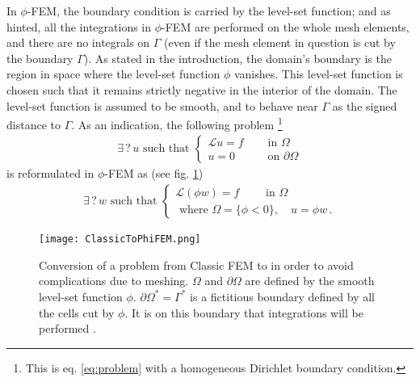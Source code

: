 In $\phi$-FEM, the boundary condition is carried by the level-set function; and as hinted, all the integrations in $\phi$-FEM are performed on the whole mesh elements, and there are no integrals on $\Gamma$ (even if the mesh element in question is cut by the boundary $\Gamma$). As stated in the introduction, the domain's boundary is the region in space where the level-set function $\phi$ vanishes. This level-set function is chosen such that it remains strictly negative in the interior of the domain. The level-set function is assumed to be smooth, and to behave near $\Gamma$ as the signed distance to $\Gamma$. As an indication, the following problem \footnote{This is eq. \eqref{eq:problem} with a homogeneous Dirichlet boundary condition.}
\begin{align*}
    \exists \, ? \, u \text{ such that }
    \begin{cases}
        \mathcal{L} u = f \quad &\text{ in } \Omega \\ 
        u=0 & \text{ on } \partial \Omega
    \end{cases}
\end{align*}
is reformulated in $\phi$-FEM as (see fig. \ref{fig:ClassicToPhiFEM})
\begin{align*}
    \exists \, ? \, w \text{ such that }
    \begin{cases}
        \mathcal{L} (\phi w) = f \qquad \text{ in } \Omega \\ 
        \text{ where } \Omega = \{ \phi <0 \}, \quad u=\phi w \,.
    \end{cases}
\end{align*}

\begin{figure}[H]
    \centering
    \texttt{[image: ClassicToPhiFEM.png]}
    \caption{Conversion of a problem from Classic FEM to \phifem in order to avoid complications due to meshing. $\Omega$ and $\partial \Omega$ are defined by the smooth level-set function $\phi$. $\partial\Omega^* = \Gamma^*$ is a fictitious boundary defined by all the cells cut by $\phi$. It is on this boundary that integrations will be performed \parencite{Reference2}.}
    \label{fig:ClassicToPhiFEM}
\end{figure}

